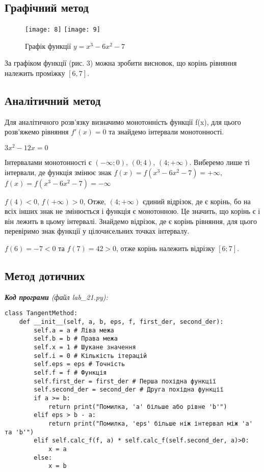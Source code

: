 \documentclass{article}
\begin{document}
\begin{large}
	\subsection*{Графічний метод}
	\begin{figure}[h!]
		\centering
		\texttt{[image: 8]}
		\hfill
		\texttt{[image: 9]}
		\caption{Графік функції $y=x^3-6x^2-7$}
	\end{figure}
	За графіком функції (рис. 3) можна зробити висновок, що корінь рівняння належить проміжку $[6,7]$.
	
	\subsection*{Аналітичний метод}
	Для аналітичного розв’язку визначимо монотонність функції f(x), для цього розв’яжемо рівняння $f'(x) = 0$ та знайдемо інтервали монотонності.
	
	$3x^2-12x=0$
	
	Інтервалами монотонності є $(-\infty; 0)$, $(0; 4)$, $(4; +\infty)$. Виберемо лише ті інтервали, де функція змінює знак $f(x) = f(x^3-6x^2-7) = +\infty$, $f(x) = f(x^3-6x^2-7) = -\infty$
	
	$f(4) < 0$, $f(+\infty) > 0$, Отже, $(4; +\infty)$ єдиний відрізок, де є корінь, бо на всіх інших знак не змінюється і функція є монотонною. Це значить, що корінь є і він лежить в цьому інтервалі. Знайдемо відрізок, де є корінь рівняння, для цього перевіримо знак функції у цілочисельних точках інтервалу.
	
	$f(6) = -7 < 0$ та $f(7) = 42 > 0$, отже корінь належить відрізку $[6; 7]$.
	
	\subsection*{Метод дотичних}	
	\noindent\textit{\textbf{Код програми} (файл lab\_21.py):}
	\begin{lstlisting}
class TangentMethod:
	def __init__(self, a, b, eps, f, first_der, second_der):
		self.a = a # Ліва межа
		self.b = b # Права межа
		self.x = 1 # Шукане значення
		self.i = 0 # Кількість ітерацій
		self.eps = eps # Точність
		self.f = f # Функція
		self.first_der = first_der # Перша похідна функції
		self.second_der = second_der # Друга похідна функції
		if a >= b:
			return print("Помилка, 'a' більше або рівне 'b'")
		elif eps > b - a:
			return print("Помилка, 'eps' більше ніж інтервал між 'a' та 'b'")
		elif self.calc_f(f, a) * self.calc_f(self.second_der, a)>0:
			x = a
		else:
			x = b
	

\end{lstlisting}
\end{large}
\end{document}
